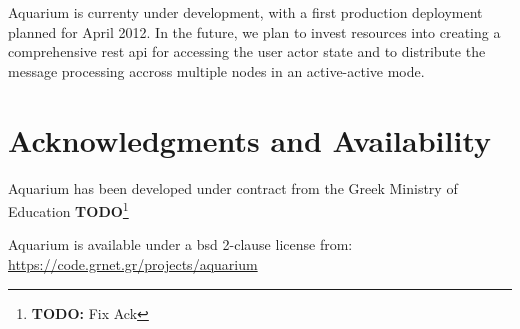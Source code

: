 \documentclass[letterpaper,twocolumn,10pt]{article}
\newcommand{\todo}[1]{\textbf{TODO}\footnote{\textbf{TODO:} #1}}
\begin{document}
Aquarium is currenty under development, with a first production deployment
planned for April 2012. In the future, we plan to invest resources into
creating a comprehensive {\sc rest api} for accessing the user actor state and
to distribute the message processing accross multiple nodes in an active-active
mode.

\section{Acknowledgments and Availability}

Aquarium has been developed under contract from the Greek Ministry of Education
\todo{Fix Ack}

Aquarium is available under a {\sc bsd} 2-clause license from:
\url{https://code.grnet.gr/projects/aquarium}

{\footnotesize 
}

\theendnotes
\end{document}
